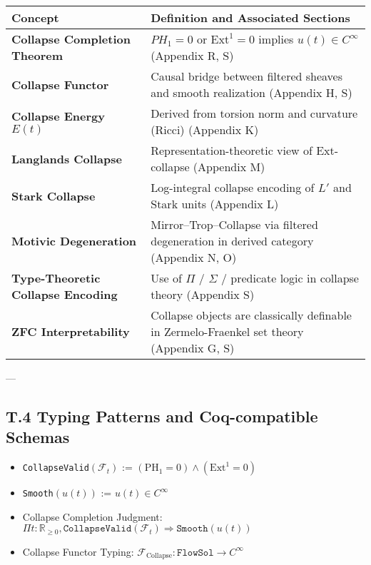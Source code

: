 \documentclass[11pt]{article}
\begin{document}
\begin{center}
\begin{tabular}{|p{4cm}|p{8cm}|}
\hline
\textbf{Concept} & \textbf{Definition and Associated Sections} \\
\hline
\textbf{Collapse Completion Theorem} & $PH_1 = 0$ or $\mathrm{Ext}^1 = 0$ implies $u(t) \in C^\infty$ \newline (Appendix R, S) \\
\textbf{Collapse Functor} & Causal bridge between filtered sheaves and smooth realization \newline (Appendix H, S) \\
\textbf{Collapse Energy $E(t)$} & Derived from torsion norm and curvature (Ricci) \newline (Appendix K) \\
\textbf{Langlands Collapse} & Representation-theoretic view of Ext-collapse \newline (Appendix M) \\
\textbf{Stark Collapse} & Log-integral collapse encoding of $L'$ and Stark units \newline (Appendix L) \\
\textbf{Motivic Degeneration} & Mirror–Trop–Collapse via filtered degeneration in derived category \newline (Appendix N, O) \\
\textbf{Type-Theoretic Collapse Encoding} & Use of $\Pi$ / $\Sigma$ / predicate logic in collapse theory \newline (Appendix S) \\
\textbf{ZFC Interpretability} & Collapse objects are classically definable in Zermelo-Fraenkel set theory \newline (Appendix G, S) \\
\hline
\end{tabular}
\end{center}

---

\subsection*{T.4 Typing Patterns and Coq-compatible Schemas}

\begin{itemize}
  \item \texttt{CollapseValid}$(\mathcal{F}_t)$ := $(\mathrm{PH}_1 = 0) \wedge (\mathrm{Ext}^1 = 0)$
  \item \texttt{Smooth}$(u(t))$ := $u(t) \in C^\infty$
  \item Collapse Completion Judgment: $\Pi t:\mathbb{R}_{\ge 0}, \texttt{CollapseValid}(\mathcal{F}_t) \Rightarrow \texttt{Smooth}(u(t))$
  \item Collapse Functor Typing: $\mathcal{F}_{\mathrm{Collapse}} : \texttt{FlowSol} \to C^\infty$
\end{itemize}
\end{document}
